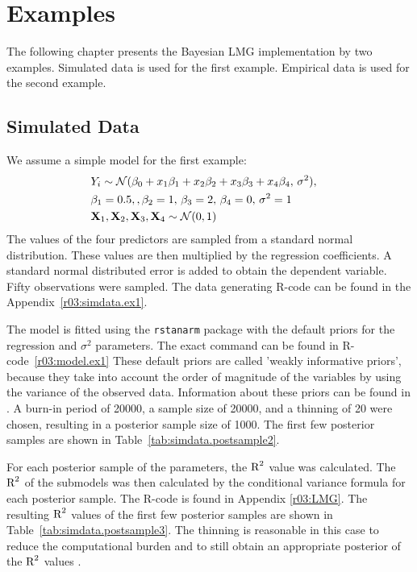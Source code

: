 \documentclass[11pt,a4paper,twoside]{book}
\begin{document}












\chapter{Examples}

The following chapter presents the Bayesian LMG implementation by two examples. Simulated data is used for the first example. Empirical data is used for the second example.

\section{Simulated Data}

We assume a simple model for the first example: 
\begin{align*} 
&Y_{i} \sim \mathcal{N}(\beta_{0}+x_{1} \beta_{1}+x_{2} \beta_{2}+x_{3} \beta_{3}+x_{4} \beta_{4}, \, \sigma^2),& \\ & \beta_{1} = 0.5, , \beta_{2} = 1, \, \beta_{3} = 2 , \, \beta_{4}=0, \, \sigma^2 = 1 & \\ & {\mathbf{X}}_{1}, {\mathbf{X}}_{2},{\mathbf{X}}_{3},{\mathbf{X}}_{4} \sim \mathcal{N}(0, 1) 
\end{align*} 
The values of the four predictors are sampled from a standard normal distribution. These values are then multiplied by the regression coefficients. A standard normal distributed error is added to obtain the dependent variable. Fifty observations were sampled. The data generating R-code can be found in the Appendix~\ref{r03:simdata.ex1}.




The model is fitted using the \texttt{rstanarm} package \citep{rstanarm} with the default priors for the regression and $\sigma^2$ parameters. The exact command can be found in R-code~\ref{r03:model.ex1} These default priors are called 'weakly informative priors', because they take into account the order of magnitude of the variables by using the variance of the observed data. Information about these priors can be found in \cite{stanM2017}. A burn-in period of 20000, a sample size of 20000, and a thinning of 20 were chosen, resulting in a posterior sample size of 1000. The first few posterior samples are shown in Table~\ref{tab:simdata.postsample2}. 

For each posterior sample of the parameters, the $\text{R}^2$ value was calculated. The $\text{R}^2$ of the submodels was then calculated by the conditional variance formula for each posterior sample. The R-code is found in Appendix \ref{r03:LMG}. The resulting $\text{R}^2$ values of the first few posterior samples are shown in Table~\ref{tab:simdata.postsample3}.  The thinning is reasonable in this case to reduce the computational burden and to still obtain an appropriate posterior of the $\text{R}^2$ values \citep{Link2012}. 
\end{document}
